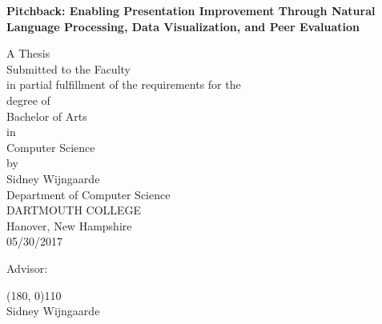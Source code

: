 \pagestyle{plain}
\begin{center}
\textbf{Pitchback: Enabling Presentation Improvement Through Natural Language
Processing, Data Visualization, and Peer Evaluation}
\vspace{0.4cm}

A Thesis\\ [0.4cm]
Submitted to the Faculty \\ [0.4cm]
in partial fulfillment of the requirements for the \\[0.4cm]
degree of \\[0.4cm]
Bachelor of Arts\\in\\Computer Science\\[0.4cm]
by\\[0.5cm]
Sidney Wijngaarde\\[0.4cm]
Department of Computer Science \\ [0.4cm]
DARTMOUTH COLLEGE \\ [0.4cm]
Hanover, New Hampshire \\[0.4cm]
05/30/2017 %
\vspace{1.5cm}

\end{center}

Advisor:

\begin{flushright}

\line(180, 0){110} \\
Sidney Wijngaarde \\[1cm]







\end{flushright}







